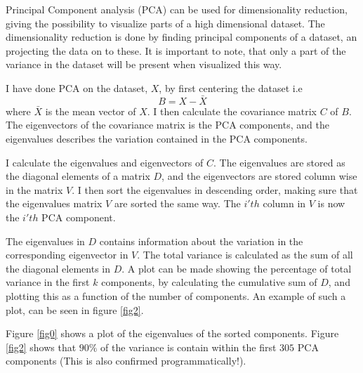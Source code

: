 \documentclass[10pt]{article}
\begin{document}
Principal Component analysis (PCA) can be used for dimensionality reduction, giving the possibility to visualize parts of a high dimensional dataset. The dimensionality reduction is done by finding principal components of a dataset, an projecting the data on to these. It is important to note, that only a part of the variance in the dataset will be present when visualized this way.

I have done PCA on the dataset, $X$, by first centering the dataset i.e
\begin{equation}
  B = X - \bar{X}
\end{equation} 
where $\bar{X}$ is the mean vector of $X$. I then calculate the covariance matrix $C$ of $B$. The eigenvectors of the covariance matrix is the PCA components, and the eigenvalues describes the variation contained in the PCA components. 

I calculate the eigenvalues and eigenvectors of $C$. The eigenvalues are stored as the diagonal elements of a matrix $D$, and the eigenvectors are stored column wise in the matrix $V$. I then sort the eigenvalues in descending order, making sure that the eigenvalues matrix $V$ are sorted the same way. The $i'th$ column in $V$ is now the $i'th$ PCA component. 

The eigenvalues in $D$ contains information about the variation in the corresponding eigenvector in $V$. The total variance is calculated as the sum of all the diagonal elements in $D$. A plot can be made showing the percentage of total variance in the first $k$ components, by calculating the cumulative sum of $D$, and plotting this as a function of the number of components. An example of such a plot, can be seen in figure \ref{fig2}.
  
Figure \ref{fig0} shows a plot of the eigenvalues of the sorted components. Figure \ref{fig2} shows that $90\%$ of the variance is contain within the first $305$ PCA components (This is also confirmed programmatically!).
\end{document}
